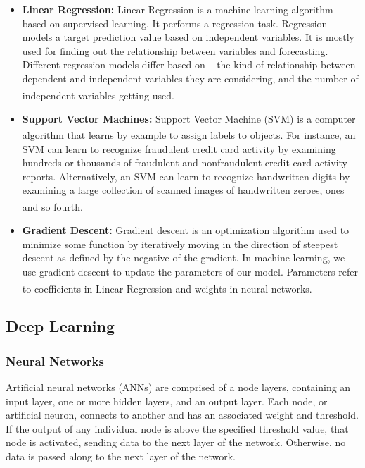 \begin{itemize}
  \item \textbf{Linear Regression:}
      Linear Regression is a machine learning algorithm based on supervised learning. It performs a regression task. Regression models a target prediction value based on independent variables. It is mostly used for finding out the relationship between variables and forecasting. Different regression models differ based on – the kind of relationship between dependent and independent variables they are considering, and the number of independent variables getting used. \textsuperscript{\cite{LR-GeeksForGeeks}}
  \item \textbf{Support Vector Machines:}
      Support Vector Machine (SVM) is a computer algorithm that learns by example to assign labels to objects. \textsuperscript{\cite{boser1992training}} For instance, an SVM can learn to recognize fraudulent credit card activity by examining hundreds or thousands of fraudulent and nonfraudulent credit card activity reports. Alternatively, an SVM can learn to recognize handwritten digits by examining a large collection of scanned images of handwritten zeroes, ones and so fourth. \textsuperscript{\cite{noble2006support}}
  \item \textbf{Gradient Descent:}
      Gradient descent is an optimization algorithm used to minimize some function by iteratively moving in the direction of steepest descent as defined by the negative of the gradient. In machine learning, we use gradient descent to update the parameters of our model. Parameters refer to coefficients in Linear Regression and weights in neural networks. \textsuperscript{\cite{DG-ml-cheatsheet}}
\end{itemize}

\subsection{Deep Learning}
\subsubsection{Neural Networks}
Artificial neural networks (ANNs) are comprised of a node layers, containing an input layer, one or more hidden layers, and an output layer. Each node, or artificial neuron, connects to another and has an associated weight and threshold. If the output of any individual node is above the specified threshold value, that node is activated, sending data to the next layer of the network. Otherwise, no data is passed along to the next layer of the network.


